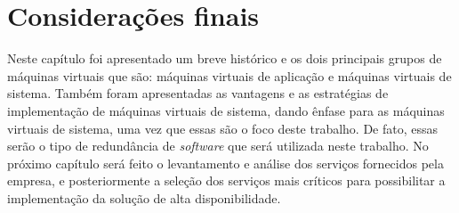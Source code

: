 \section{Considerações finais}

Neste capítulo foi apresentado um breve histórico e os dois principais grupos de máquinas virtuais que são: máquinas virtuais de aplicação e 
máquinas virtuais de sistema. Também foram apresentadas as vantagens e as estratégias de implementação de máquinas virtuais de sistema,
dando ênfase para as máquinas virtuais de sistema, uma vez que essas são o foco deste trabalho. De fato, essas serão o tipo de redundância de
\textit{software} que será utilizada neste trabalho. No próximo capítulo será feito o levantamento e análise dos serviços fornecidos pela empresa, 
e posteriormente a seleção dos serviços mais críticos para possibilitar a implementação da solução de alta disponibilidade.

